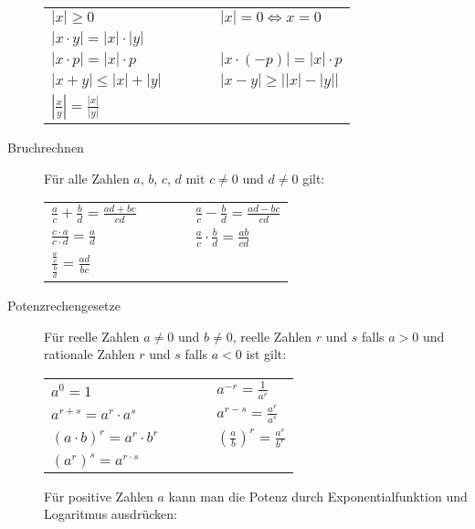 \documentclass[9pt,ngerman,a4paper,landscape]{scrartcl}
\begin{document}
\begin{multicols}{3}
\begin{description}
\begin{tabular}{ l c l }
    $|x| \geq 0$                                    & $\qquad$  &   $|x| = 0 \Longleftrightarrow x=0$ \\
    $|x \cdot y| = |x| \cdot |y|$                   &   & \\
    $|x \cdot p| = |x| \cdot p$                     & $\qquad$  &   $|x \cdot (-p)| = |x| \cdot p$ \\
    $|x+y| \leq |x| + |y|$                          & $\qquad$  &   $|x-y| \geq \left| |x| - |y| \right|$ \\
    $\left|\frac{x}{y}\right| = \frac{|x|}{|y|}$    & $\qquad$  &   \\
\end{tabular}
\item[Bruchrechnen]
Für alle Zahlen \(a\), \(b\), \(c\), \(d\) mit \(c\neq 0\) und
\(d \neq 0\) gilt:

\begin{tabular}{ l c l }
    $\displaystyle \frac{a}{c} + \frac{b}{d} = \frac{ad+bc}{cd}$    & $\qquad$  &   $\displaystyle \frac{a}{c} - \frac{b}{d} = \frac{ad-bc}{cd}$ \\
    $\displaystyle \frac{c\cdot a}{c \cdot d} = \frac{a}{d}$        & $\qquad$  &   $\displaystyle \frac{a}{c} \cdot \frac{b}{d} = \frac{ab}{cd}$ \\
    $\displaystyle \frac{\frac{a}{c}}{\frac{b}{d}} = \frac{ad}{bc}$ & & \\
\end{tabular}
\item[Potenzrechengesetze]
Für reelle Zahlen \(a\neq0\) und \(b\neq0\), reelle Zahlen \(r\) und
\(s\) falls \(a>0\) und rationale Zahlen \(r\) und \(s\) falls \(a<0\)
ist gilt:

\begin{tabular}{ l c l }
    $\displaystyle a^0 = 1$                 & $\qquad$  & $\displaystyle a^{-r} = \frac{1}{a^r}$ \\
    $\displaystyle a^{r+s} = a^r \cdot a^s$ & $\qquad$  & $\displaystyle a^{r-s} = \frac{a^r}{a^s}$ \\
    $\displaystyle (a \cdot b)^{r} = a^r \cdot b^r$ & $\qquad$  & $\displaystyle \left(\frac{a}{b}\right)^{r} = \frac{a^r}{b^r}$ \\
    $\displaystyle (a^r)^{s} = a^{r \cdot s}$ & & \\
\end{tabular}

Für positive Zahlen \(a\) kann man die Potenz durch Exponentialfunktion
und Logaritmus ausdrücken:


\end{description}
\end{multicols}
\end{document}
